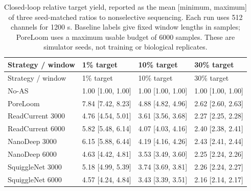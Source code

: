 \begin{longtable}{llll}
\caption{Closed-loop relative target yield, reported as the mean [minimum, maximum] of three seed-matched ratios to nonselective sequencing. Each run uses 512 channels for 1200 s. Baseline labels give fixed window lengths in samples; PoreLoom uses a maximum usable budget of 6000 samples. These are simulator seeds, not training or biological replicates.}\label{tab:s_icarust_yield}\\
\toprule
Strategy / window & 1\% target & 10\% target & 30\% target\\\midrule\endfirsthead
\toprule
Strategy / window & 1\% target & 10\% target & 30\% target\\\midrule\endhead
\bottomrule\endfoot
No-AS & 1.00 [1.00, 1.00] & 1.00 [1.00, 1.00] & 1.00 [1.00, 1.00]\\
PoreLoom & 7.84 [7.42, 8.23] & 4.88 [4.82, 4.96] & 2.62 [2.60, 2.63]\\
ReadCurrent 3000 & 4.76 [4.54, 5.01] & 3.61 [3.56, 3.68] & 2.27 [2.25, 2.28]\\
ReadCurrent 6000 & 5.82 [5.48, 6.14] & 4.07 [4.03, 4.16] & 2.40 [2.38, 2.41]\\
NanoDeep 3000 & 6.15 [5.88, 6.44] & 4.19 [4.16, 4.26] & 2.43 [2.41, 2.44]\\
NanoDeep 6000 & 4.63 [4.42, 4.81] & 3.53 [3.49, 3.60] & 2.25 [2.24, 2.26]\\
SquiggleNet 3000 & 5.18 [4.99, 5.39] & 3.74 [3.69, 3.81] & 2.26 [2.24, 2.27]\\
SquiggleNet 6000 & 4.57 [4.24, 4.84] & 3.43 [3.39, 3.51] & 2.16 [2.14, 2.17]\\
\end{longtable}
